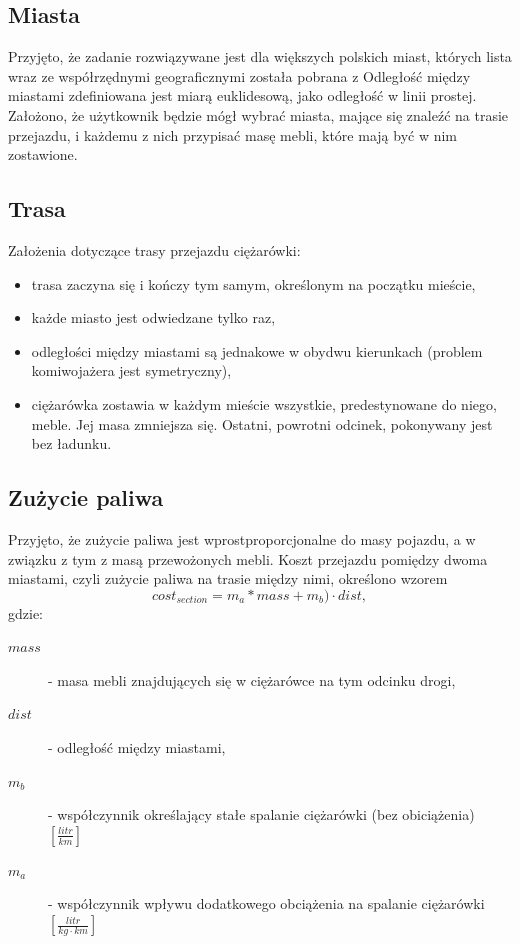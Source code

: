 \documentclass[12pt, oneside, final]{report}
\begin{document}
\subsection{Miasta}
Przyjęto, że zadanie rozwiązywane jest dla większych polskich miast, których lista wraz ze współrzędnymi geograficznymi została pobrana z %
Odległość między miastami zdefiniowana jest miarą euklidesową, jako odległość w linii prostej. Założono, że użytkownik będzie mógł wybrać miasta, mające się znaleźć na trasie przejazdu, i każdemu z nich przypisać masę mebli, które mają być w nim zostawione.

\subsection{Trasa}
Założenia dotyczące trasy przejazdu ciężarówki:
\begin{itemize}
\item trasa zaczyna się i kończy tym samym, określonym na początku mieście,
\item każde miasto jest odwiedzane tylko raz,
\item odległości między miastami są jednakowe w obydwu kierunkach (problem komiwojażera jest symetryczny),
\item ciężarówka zostawia w każdym mieście wszystkie, predestynowane do niego, meble. Jej masa zmniejsza się. Ostatni, powrotni odcinek, pokonywany jest bez ładunku.
\end{itemize}

\subsection{Zużycie paliwa}
Przyjęto, że zużycie paliwa jest wprostproporcjonalne do masy pojazdu, a w związku z tym z masą przewożonych mebli. Koszt przejazdu pomiędzy dwoma miastami, czyli zużycie paliwa na trasie między nimi, określono wzorem
\begin{equation}
cost_{section} = m_a * mass + m_b) \cdot dist,
\end{equation}
gdzie: 
\begin{description}
\item[$mass$] - masa mebli znajdujących się w ciężarówce na tym odcinku drogi,
\item[$dist$] - odległość między miastami,
\item[$m_b$] - współczynnik określający stałe spalanie ciężarówki (bez obiciążenia) $[\frac{litr}{km}]$
\item[$m_a$] - współczynnik wpływu dodatkowego obciążenia na spalanie ciężarówki $[\frac{litr}{kg \cdot km}]$
\end{description}
\end{document}
